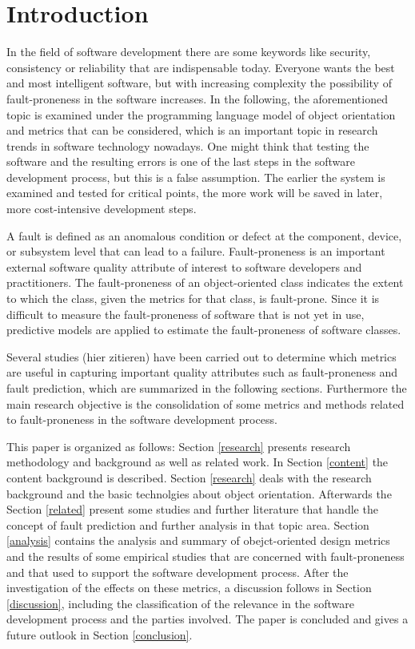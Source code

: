\section{Introduction}

In the field of software development there are some keywords like security, consistency or reliability that are indispensable today. Everyone wants the best and most intelligent software, but with increasing complexity the possibility of fault-proneness in the software increases. In the following, the aforementioned topic is examined under the programming language model of object orientation and metrics that can be considered, which is an important topic in research trends in software technology nowadays.
One might think that testing the software and the resulting errors is one of the last steps in the software development process, but this is a false assumption. The earlier the system is examined and tested for critical points, the more work will be saved in later, more cost-intensive development steps.

A fault is defined as an anomalous condition or defect at the component, device, or subsystem level that can lead to a failure.
Fault-proneness is an important external software quality attribute of interest to software developers and practitioners. The fault-proneness of an object-oriented class indicates the extent to which the class, given the metrics for that class, is fault-prone. Since it is difficult to measure the fault-proneness of software that is not yet in use, predictive models are applied to estimate the fault-proneness of software classes.

Several studies (hier zitieren) have been carried out to determine which metrics are useful in capturing important quality attributes such as fault-proneness  and fault prediction, which are summarized in the following sections.
Furthermore the main research objective is the consolidation of some metrics and methods related to fault-proneness in the software development process.

This paper is organized as follows: Section \ref{research} presents research methodology and background as well as related work. In Section \ref{content} the content background is described. Section \ref{research} deals with the research background and the basic technolgies about object orientation. Afterwards the Section \ref{related} present some studies and further literature that handle the concept of fault prediction and further analysis in that topic area. Section \ref{analysis} contains the analysis and summary of obejct-oriented design metrics and the results of some empirical studies that are concerned with fault-proneness and that used to support the software development process. After the investigation of the effects on these metrics, a discussion follows in Section \ref{discussion}, including the classification of the relevance in the software development process and the parties involved. The paper is concluded and gives a future outlook in Section \ref{conclusion}.